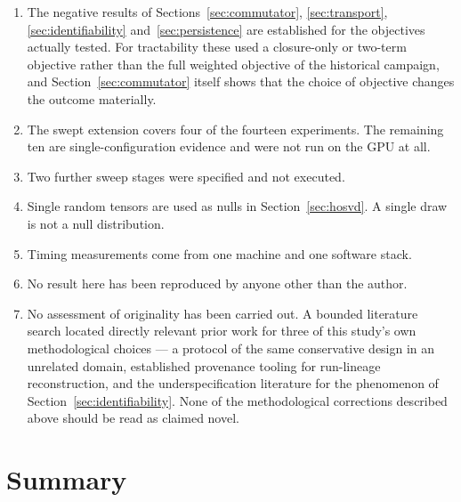 \documentclass[11pt]{amsart}
\theoremstyle{remark}
\begin{document}
\begin{enumerate}[leftmargin=*]
\item The negative results of Sections~\ref{sec:commutator}, \ref{sec:transport},
\ref{sec:identifiability} and~\ref{sec:persistence} are established for the objectives
actually tested. For tractability these used a closure-only or two-term objective rather
than the full weighted objective of the historical campaign, and
Section~\ref{sec:commutator} itself shows that the choice of objective changes the outcome
materially.
\item The swept extension covers four of the fourteen experiments. The remaining ten are
single-configuration evidence and were not run on the GPU at all.
\item Two further sweep stages were specified and not executed.
\item Single random tensors are used as nulls in Section~\ref{sec:hosvd}. A single draw is
not a null distribution.
\item Timing measurements come from one machine and one software stack.
\item No result here has been reproduced by anyone other than the author.
\item No assessment of originality has been carried out. A bounded literature search
located directly relevant prior work for three of this study's own methodological choices
--- a protocol of the same conservative design in an unrelated domain, established
provenance tooling for run-lineage reconstruction, and the underspecification literature
\cite{DAmourEtAl2022} for the phenomenon of Section~\ref{sec:identifiability}. None of the
methodological corrections described above should be read as claimed novel.
\end{enumerate}

\section{Summary}
\label{sec:summary}
\end{document}
